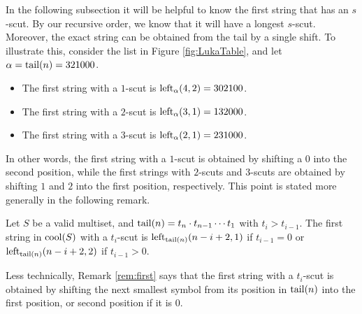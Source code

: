 In the following subsection it will be helpful to know the first string that has an $s$-scut.
By our recursive order, we know that it will have a longest $s$-scut.
Moreover, the exact string can be obtained from the tail by a single shift.
To illustrate this, consider the list in Figure \ref{fig:LukaTable}, and let $\alpha = \tail(n) = 321000$.
\begin{itemize}
    \item The first string with a $1$-scut is $\lshiftindex[\alpha]{4}{2} = 302100$.
    \item The first string with a $2$-scut is $\lshiftindex[\alpha]{3}{1} = 132000$.
    \item The first string with a $3$-scut is $\lshiftindex[\alpha]{2}{1} = 231000$.
\end{itemize}
In other words, the first string with a $1$-scut is obtained by shifting a $0$ into the second position, while the first strings with $2$-scuts and $3$-scuts are obtained by shifting $1$ and $2$ into the first position, respectively.
This point is stated more generally in the following remark.

\begin{remark}
\label{rem:first}
Let $S$ be a valid multiset, and $\tail(n) = t_n \cdot t_{n-1} \cdots t_1$ with $t_i > t_{i-1}$.
The first string in $\cool{S}$ with a $t_i$-scut is $\lshiftindex[\tail(n)]{n-i+2}{1}$ if $t_{i-1} = 0$ or $\lshiftindex[\tail(n)]{n-i+2}{2}$ if $t_{i-1} > 0$.
\end{remark}

Less technically, Remark \ref{rem:first} says that the first string with a $t_i$-scut is obtained by shifting the next smallest symbol from its position in $\tail(n)$ into the first position, or second position if it is $0$.

